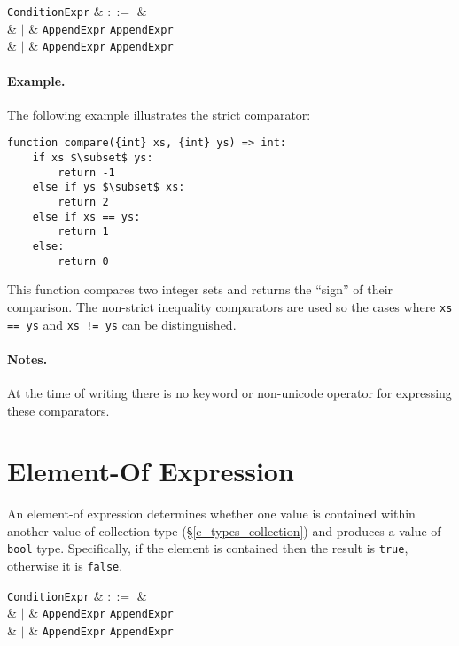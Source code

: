 \begin{syntax}
  \verb+ConditionExpr+ & $::=$ &\\
  & $|$ & \verb+AppendExpr+ \token{$\subset$} \verb+AppendExpr+\\
  & $|$ & \verb+AppendExpr+ \token{$\subseteq$} \verb+AppendExpr+\\
\end{syntax}

\paragraph{Example.} The following example illustrates the strict comparator:

\begin{lstlisting}
function compare({int} xs, {int} ys) => int:
    if xs $\subset$ ys:
        return -1
    else if ys $\subset$ xs:
        return 2
    else if xs == ys:
        return 1
    else:
        return 0
\end{lstlisting}

This function compares two integer sets and returns the ``sign'' of their comparison.  The non-strict inequality comparators are used so the cases where \lstinline{xs == ys} and \lstinline{xs != ys} can be distinguished.

\paragraph{Notes.}  At the time of writing there is no keyword or non-unicode operator for expressing these comparators.

\section{Element-Of Expression}
\label{c_expr_relational}
An element-of expression determines whether one value is contained within another value of collection type (\S\ref{c_types_collection}) and produces a value of \lstinline{bool} type.  Specifically, if the element is contained then the result is \lstinline{true}, otherwise it is \lstinline{false}.

\begin{syntax}
  \verb+ConditionExpr+ & $::=$ &\\
  & $|$ & \verb+AppendExpr+  \verb+AppendExpr+\\
  & $|$ & \verb+AppendExpr+ \token{$\in$} \verb+AppendExpr+\\
\end{syntax}

